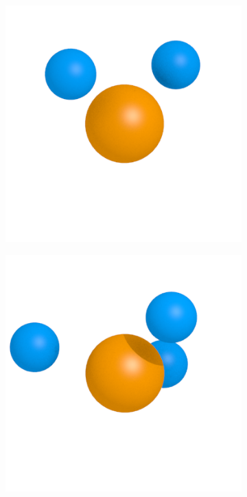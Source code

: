 \begin{figure}
\begin{subfigure}[b]{0.24\textwidth}
        \includegraphics[width=\textwidth]{images/passivation/tetrahedra02.png}
        \caption{}
    \end{subfigure}
    \begin{subfigure}[b]{0.24\textwidth}
        \includegraphics[width=\textwidth]{images/passivation/tetrahedra03.png}

\end{subfigure}
\end{figure}
